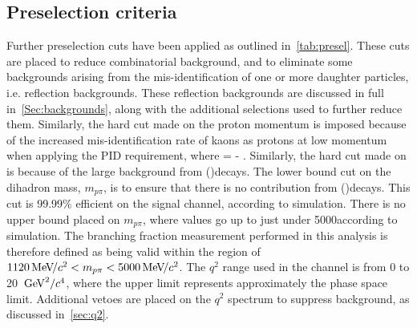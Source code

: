 \subsection{Preselection criteria}\label{Sec:Presel}


Further preselection cuts have been applied as outlined in~\autoref{tab:presel}.  These cuts are placed to reduce combinatorial background, and to eliminate some backgrounds arising from the mis-identification of one or more daughter particles, i.e. reflection backgrounds. These reflection backgrounds are discussed in full in~\autoref{Sec:backgrounds}, along with the additional selections used to further reduce them. Similarly, the hard cut made on the proton momentum is imposed because of the increased mis-identification rate of kaons as protons at low momentum when applying the PID \dllpk requirement, where \dllpk = \dllppi - \dllkpi. Similarly, the hard cut made on \dllpk is because of the large background from \Bd\to\Kstarz(\to\Kp\pim)\mumu decays. The lower bound cut on the dihadron mass, $m_{p\pi}$, is to ensure that there is no contribution from \Lb\to\Lz(\to\proton\pim)\mumu decays. This cut is 99.99\% efficient on the signal channel, according to simulation. There is no upper bound placed on $m_{p\pi}$, where values go up to just under 5000\mevcc according to simulation. The branching fraction measurement performed in this analysis is therefore defined as being valid within the region of $1120{\mathrm{\,Me\kern -0.1em V\!/}c^2}<m_{p\pi}<5000{\mathrm{\,Me\kern -0.1em V\!/}c^2}$. The $q^{2}$ range used in the \Lbpi channel is from 0 to 20 $\mathrm{\,Ge\kern -0.1em V}^{2}/c^{4}$, where the upper limit represents approximately the phase space limit. Additional vetoes are placed on the $q^{2}$ spectrum to suppress background, as discussed in~\autoref{sec:q2}.




